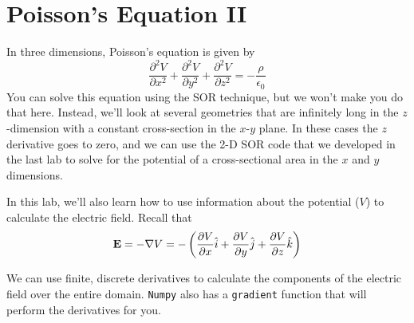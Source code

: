 \chapter{Poisson's Equation II}
\label{Lab:22}

In three dimensions, Poisson's equation is given by
\begin{equation}
    \frac{\partial^2 V}{\partial x^2} +
    \frac{\partial^2 V}{\partial y^2} +
    \frac{\partial^2 V}{\partial z^2} = -
    \frac{\rho}{\epsilon_0}
\end{equation}
You can solve this equation using the SOR technique, but we won't
make you do that here.  Instead, we'll look at several geometries
that are infinitely long in the $z$-dimension with a constant
cross-section in the $x$-$y$ plane. In these cases the $z$
derivative goes to zero, and we can use the 2-D SOR code that we
developed in the last lab to solve for the potential of a
cross-sectional area in the $x$ and $y$ dimensions.

In this lab, we'll also learn how to use information about the
potential ($V$) to calculate the electric field.  Recall that     
\begin{equation}\label{eq:EField}
        {\bf E} = - \nabla V = - \left( {\partial V\over \partial
            x}\hat{i} + {\partial V\over \partial y}\hat{j} + {\partial V\over \partial z}\hat{k}\right)
      \end{equation}

We can use finite, discrete derivatives to calculate the components of
the electric field over the entire domain.  \texttt{Numpy} also has a
\texttt{gradient} function that will perform the derivatives for you.

%


